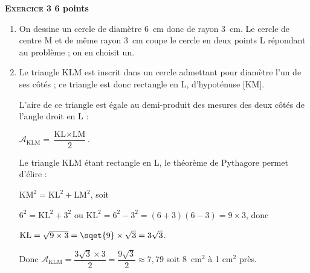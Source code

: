\textbf{\textsc{Exercice 3} \hfill 6 points}

\medskip

%
%

\begin{enumerate}
\item %
On dessine un cercle de diamètre 6~cm donc de rayon 3~cm. Le cercle de centre M et de même rayon 3~cm coupe le cercle en deux points L répondant au problème ; on en choisit un.
\item %
Le triangle KLM est inscrit dans un cercle admettant pour diamètre l'un de ses côtés ; ce triangle est donc rectangle en L, d'hypoténuse [KM].

L'aire de ce triangle est égale au demi-produit des mesures des deux côtés de l'angle droit en L :

$\mathcal{A}_{\text{KLM}} = \dfrac{\text{KL} \times \text{LM} }{2}$.

Le triangle KLM étant rectangle en L, le théorème de Pythagore permet d'élire :

$\text{KM}^2 = \text{KL}^2 + \text{LM}^2$, soit 

$6^2 = \text{KL}^2 + 3^2$ ou $\text{KL}^2 = 6^2 - 3^2 = (6 + 3)(6 - 3) = 9 \times 3$, donc 

$\text{KL} = \sqrt{9 \times 3} = \sqet{9} \times \sqrt{3} = 3\sqrt{3}$.

Donc $\mathcal{A}_{\text{KLM}} = \dfrac{3\sqrt{3} \times 3 }{2} = \dfrac{9\sqrt{3}}{2} \approx 7,79$ soit 8~cm$^2$ à 1 cm$^2$ près.
\end{enumerate}

\vspace{0,5cm}

